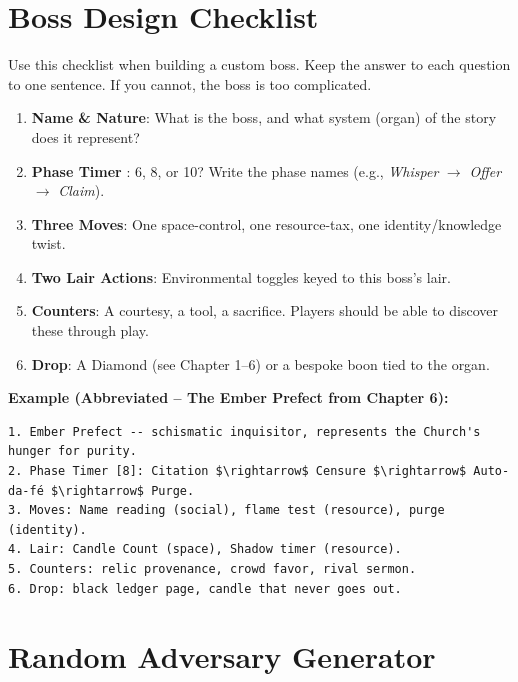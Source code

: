 
\section*{Boss Design Checklist}

\noindent Use this checklist when building a custom boss. Keep the answer to each question to one sentence. If you cannot, the boss is too complicated.

\begin{enumerate}
    \item \textbf{Name \& Nature}: What is the boss, and what system (organ) of the story does it represent?
    \item \textbf{Phase Timer }: 6, 8, or 10? Write the phase names (e.g., \emph{Whisper} $\rightarrow$ \emph{Offer} $\rightarrow$ \emph{Claim}).
    \item \textbf{Three Moves}: One space-control, one resource-tax, one identity/knowledge twist.
    \item \textbf{Two Lair Actions}: Environmental toggles keyed to this boss's lair.
    \item \textbf{Counters}: A courtesy, a tool, a sacrifice. Players should be able to discover these through play.
    \item \textbf{Drop}: A Diamond (see Chapter 1--6) or a bespoke boon tied to the organ.
\end{enumerate}

\noindent\textbf{Example (Abbreviated -- The Ember Prefect from Chapter 6):}

\begin{verbatim}
1. Ember Prefect -- schismatic inquisitor, represents the Church's hunger for purity.
2. Phase Timer [8]: Citation $\rightarrow$ Censure $\rightarrow$ Auto-da-fé $\rightarrow$ Purge.
3. Moves: Name reading (social), flame test (resource), purge (identity).
4. Lair: Candle Count (space), Shadow timer (resource).
5. Counters: relic provenance, crowd favor, rival sermon.
6. Drop: black ledger page, candle that never goes out.
\end{verbatim}


\section*{Random Adversary Generator}

